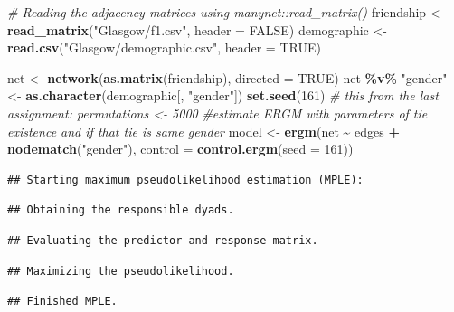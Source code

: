 \documentclass[
]{article}
\newenvironment{Shaded}{\begin{snugshade}}{\end{snugshade}}
\newcommand{\AttributeTok}[1]{\textcolor[rgb]{0.13,0.29,0.53}{#1}}
\newcommand{\CommentTok}[1]{\textcolor[rgb]{0.56,0.35,0.01}{\textit{#1}}}
\newcommand{\ConstantTok}[1]{\textcolor[rgb]{0.56,0.35,0.01}{#1}}
\newcommand{\DecValTok}[1]{\textcolor[rgb]{0.00,0.00,0.81}{#1}}
\newcommand{\FunctionTok}[1]{\textcolor[rgb]{0.13,0.29,0.53}{\textbf{#1}}}
\newcommand{\NormalTok}[1]{#1}
\newcommand{\OtherTok}[1]{\textcolor[rgb]{0.56,0.35,0.01}{#1}}
\newcommand{\SpecialCharTok}[1]{\textcolor[rgb]{0.81,0.36,0.00}{\textbf{#1}}}
\newcommand{\StringTok}[1]{\textcolor[rgb]{0.31,0.60,0.02}{#1}}
\begin{document}
\begin{Shaded}
\begin{Highlighting}[]
\CommentTok{\# Reading the adjacency matrices using manynet::read\_matrix()}
\NormalTok{friendship }\OtherTok{\textless{}{-}} \FunctionTok{read\_matrix}\NormalTok{(}\StringTok{"Glasgow/f1.csv"}\NormalTok{, }\AttributeTok{header =} \ConstantTok{FALSE}\NormalTok{)}
\NormalTok{demographic }\OtherTok{\textless{}{-}} \FunctionTok{read.csv}\NormalTok{(}\StringTok{"Glasgow/demographic.csv"}\NormalTok{, }\AttributeTok{header =} \ConstantTok{TRUE}\NormalTok{)}

\NormalTok{net }\OtherTok{\textless{}{-}} \FunctionTok{network}\NormalTok{(}\FunctionTok{as.matrix}\NormalTok{(friendship), }\AttributeTok{directed =} \ConstantTok{TRUE}\NormalTok{)}
\NormalTok{net }\SpecialCharTok{\%v\%} \StringTok{"gender"} \OtherTok{\textless{}{-}} \FunctionTok{as.character}\NormalTok{(demographic[, }\StringTok{"gender"}\NormalTok{])}
\FunctionTok{set.seed}\NormalTok{(}\DecValTok{161}\NormalTok{)}
\CommentTok{\# this from the last assignment: permutations \textless{}{-} 5000}
\CommentTok{\#estimate ERGM with parameters of tie existence and if that tie is same gender}
\NormalTok{model }\OtherTok{\textless{}{-}} \FunctionTok{ergm}\NormalTok{(net }\SpecialCharTok{\textasciitilde{}}\NormalTok{ edges }\SpecialCharTok{+} \FunctionTok{nodematch}\NormalTok{(}\StringTok{"gender"}\NormalTok{), }\AttributeTok{control =} \FunctionTok{control.ergm}\NormalTok{(}\AttributeTok{seed =} \DecValTok{161}\NormalTok{))}
\end{Highlighting}
\end{Shaded}

\begin{verbatim}
## Starting maximum pseudolikelihood estimation (MPLE):
\end{verbatim}

\begin{verbatim}
## Obtaining the responsible dyads.
\end{verbatim}

\begin{verbatim}
## Evaluating the predictor and response matrix.
\end{verbatim}

\begin{verbatim}
## Maximizing the pseudolikelihood.
\end{verbatim}

\begin{verbatim}
## Finished MPLE.
\end{verbatim}
\end{document}
